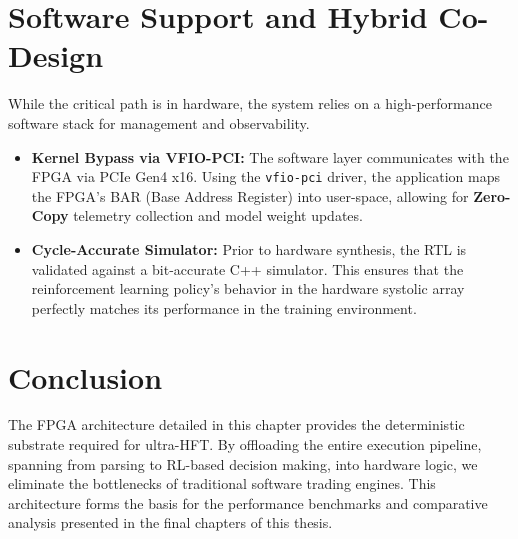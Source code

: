\section{Software Support and Hybrid Co-Design}
While the critical path is in hardware, the system relies on a high-performance software stack for management and observability.
\begin{itemize}
    \item \textbf{Kernel Bypass via VFIO-PCI:} The software layer communicates with the FPGA via PCIe Gen4 x16. Using the \texttt{vfio-pci} driver, the application maps the FPGA's BAR (Base Address Register) into user-space, allowing for \textbf{Zero-Copy} telemetry collection and model weight updates.
    \item \textbf{Cycle-Accurate Simulator:} Prior to hardware synthesis, the RTL is validated against a bit-accurate C++ simulator. This ensures that the reinforcement learning policy's behavior in the hardware systolic array perfectly matches its performance in the training environment.
\end{itemize}

\section{Conclusion}
The FPGA architecture detailed in this chapter provides the deterministic substrate required for ultra-HFT. By offloading the entire execution pipeline, spanning from parsing to RL-based decision making, into hardware logic, we eliminate the bottlenecks of traditional software trading engines.
 This architecture forms the basis for the performance benchmarks and comparative analysis presented in the final chapters of this thesis.
